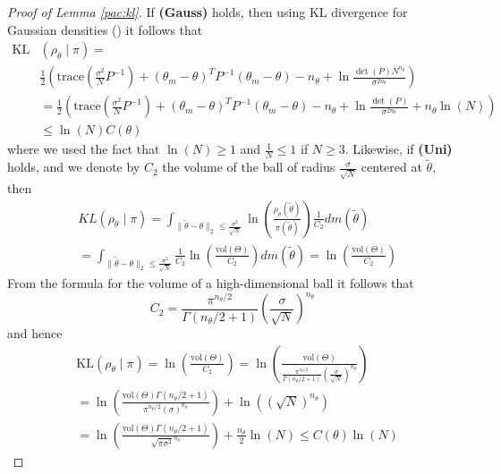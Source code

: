 \documentclass{article}
\newcommand{\KL}{\mathrm{KL}}
\renewcommand{\KL}{\mathrm{KL}}
\begin{document}
\begin{proof}[Proof of Lemma \ref{pac:kl}]
  If \textbf{(Gauss)} holds, then 
  using KL divergence for Gaussian densities (\cite[Lemma 11.3.4]{LindquistBook}) it follows
  that 
  \begin{align*}
     \KL&(\rho_{\theta} \mid \pi)  = \\
     & \frac{1}{2} \left(\mathrm{trace}\left(\frac{\sigma^2}{N}P^{-1} \right) +
          (\theta_m-\theta)^TP^{-1}(\theta_m-\theta) - n_{\theta}  + \ln \frac{\det(P)N^{n_{\theta}}}{\sigma^{2n_{\theta}}} \right)  \\
      & =\frac{1}{2} \left(\mathrm{trace}\left(\frac{\sigma^2}{N} P^{-1} \right) +
          (\theta_m-\theta)^TP^{-1}(\theta_m-\theta) - n_{\theta}  + \ln \frac{\det(P)}{\sigma^{2n_{\theta}}}+ n_{\theta}\ln(N)\right)\\
        & \le \ln(N) C(\theta)  
  \end{align*}
  where we used the fact that $\ln(N) \ge 1$   and $\frac{1}{N} \le 1$ if $N \ge 3$.
  Likewise, if \textbf{(Uni)} holds,  and we denote by
  $C_2$ the volume of the ball of radius $\frac{\sigma}{\sqrt{N}}$ centered at $\tilde{\theta}$, then
\begin{align*}
    & KL(\rho_{\theta} \mid \pi) = \int_{\|\tilde{\theta}-\theta\|_2 \le \frac{\sigma^2}{\sqrt{N}}} 
     \ln\left(\frac{\rho_{\theta}(\tilde{\theta})}{\pi(\tilde{\theta})}\right) \frac{1}{C_2} dm(\tilde{\theta})  \\
     & =\int_{\|\tilde{\theta}-\theta\|_2 \le \frac{\sigma^2}{\sqrt{N}}}  \frac{1}{C_2} \ln\left(\frac{\mathrm{vol}(\Theta)}{C_2}\right) dm(\tilde{\theta})
    = \ln\left(\frac{\mathrm{vol}(\Theta)}{C_2}\right)
\end{align*}
From the formula for the volume of a high-dimensional ball \cite{BallVolume} it follows that
\[
  C_2= \frac{\pi^{n_\theta/2}}{\Gamma(n_\theta/2+1)} \left(\frac{\sigma}{\sqrt{N}}\right)^{n_\theta}
\]
and hence 
\begin{align*}
  & \KL(\rho_{\theta} \mid \pi) = \ln\left(\frac{\mathrm{vol}(\Theta)}{C_2}\right)=
  \ln\left(\frac{\mathrm{vol}(\Theta)}{\frac{\pi^{n_\theta/2}}{\Gamma(n_\theta/2+1)} \left(\frac{\sigma}{\sqrt{N}}\right)^{n_\theta}}\right) \\
  & =\ln\left(\frac{\mathrm{vol}(\Theta) \Gamma(n_\theta/2+1)}{\pi^{n_\theta/2} (\sigma)^{n_\theta}}\right) + 
     \ln \left(\left(\sqrt{N}\right)^{n_\theta}\right) \\
     & = \ln\left(\frac{\mathrm{vol}(\Theta) \Gamma(n_\theta/2+1)}{\sqrt{\pi\sigma^2}^{n_\theta}}\right) + 
       \frac{n_{\theta}}{2} \ln(N)
       \le C(\theta)\ln(N)
\end{align*}
%
\end{proof}
\end{document}

